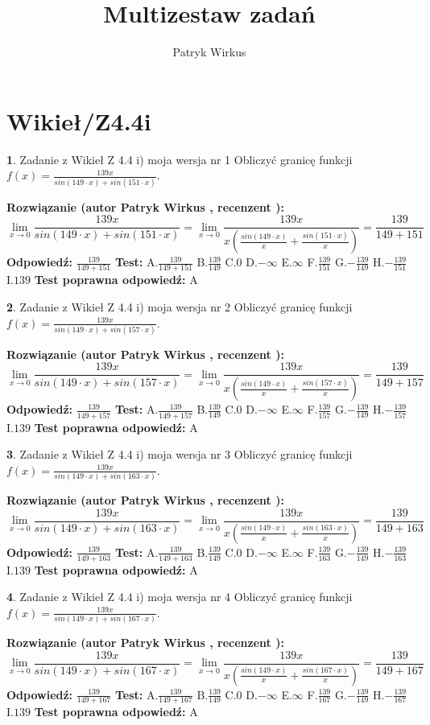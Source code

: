 \documentclass[12pt, a4paper]{article}
\title{Multizestaw zadań}
\author{Patryk Wirkus}
\date{}
\theoremstyle{definition} %
\newtheorem{zad}{}
\newcommand{\kategoria}[1]{\section{#1}}
\newcommand{\zadStart}[1]{\begin{zad}#1\newline}
\newcommand{\zadStop}{\end{zad}}
\newcommand{\rozwStart}[2]{\noindent \textbf{Rozwiązanie (autor #1 , recenzent #2): }\newline}
\newcommand{\rozwStop}{\newline}
\newcommand{\odpStart}{\noindent \textbf{Odpowiedź:}\newline}
\newcommand{\odpStop}{\newline}
\newcommand{\testStart}{\noindent \textbf{Test:}\newline}
\newcommand{\testStop}{\newline}
\newcommand{\kluczStart}{\noindent \textbf{Test poprawna odpowiedź:}\newline}
\newcommand{\kluczStop}{\newline}
\begin{document}
\maketitle

\kategoria{Wikieł/Z4.4i}


\zadStart{Zadanie z Wikieł Z 4.4 i) moja wersja nr 1}
Obliczyć granicę funkcji $f(x)=\frac{139x}{sin(149\cdot x) +sin(151\cdot x)}$.
\zadStop
\rozwStart{Patryk Wirkus}{}
$$\lim\limits_{x\to 0}\frac{139x}{sin(149\cdot x) +sin(151\cdot x)}=\lim\limits_{x\to 0}\frac{139x}{x(\frac{sin(149\cdot x)}{x}+\frac{sin(151\cdot x)}{x})}=\frac{139}{149+151}$$
\rozwStop
\odpStart
$\frac{139}{149+151}$
\odpStop
\testStart
A.$\frac{139}{149+151}$
B.$\frac{139}{149}$
C.$0$
D.$-\infty$
E.$\infty$
F.$\frac{139}{151}$
G.$-\frac{139}{149}$
H.$-\frac{139}{151}$
I.$139$
\testStop
\kluczStart
A
\kluczStop



\zadStart{Zadanie z Wikieł Z 4.4 i) moja wersja nr 2}
Obliczyć granicę funkcji $f(x)=\frac{139x}{sin(149\cdot x) +sin(157\cdot x)}$.
\zadStop
\rozwStart{Patryk Wirkus}{}
$$\lim\limits_{x\to 0}\frac{139x}{sin(149\cdot x) +sin(157\cdot x)}=\lim\limits_{x\to 0}\frac{139x}{x(\frac{sin(149\cdot x)}{x}+\frac{sin(157\cdot x)}{x})}=\frac{139}{149+157}$$
\rozwStop
\odpStart
$\frac{139}{149+157}$
\odpStop
\testStart
A.$\frac{139}{149+157}$
B.$\frac{139}{149}$
C.$0$
D.$-\infty$
E.$\infty$
F.$\frac{139}{157}$
G.$-\frac{139}{149}$
H.$-\frac{139}{157}$
I.$139$
\testStop
\kluczStart
A
\kluczStop



\zadStart{Zadanie z Wikieł Z 4.4 i) moja wersja nr 3}
Obliczyć granicę funkcji $f(x)=\frac{139x}{sin(149\cdot x) +sin(163\cdot x)}$.
\zadStop
\rozwStart{Patryk Wirkus}{}
$$\lim\limits_{x\to 0}\frac{139x}{sin(149\cdot x) +sin(163\cdot x)}=\lim\limits_{x\to 0}\frac{139x}{x(\frac{sin(149\cdot x)}{x}+\frac{sin(163\cdot x)}{x})}=\frac{139}{149+163}$$
\rozwStop
\odpStart
$\frac{139}{149+163}$
\odpStop
\testStart
A.$\frac{139}{149+163}$
B.$\frac{139}{149}$
C.$0$
D.$-\infty$
E.$\infty$
F.$\frac{139}{163}$
G.$-\frac{139}{149}$
H.$-\frac{139}{163}$
I.$139$
\testStop
\kluczStart
A
\kluczStop



\zadStart{Zadanie z Wikieł Z 4.4 i) moja wersja nr 4}
Obliczyć granicę funkcji $f(x)=\frac{139x}{sin(149\cdot x) +sin(167\cdot x)}$.
\zadStop
\rozwStart{Patryk Wirkus}{}
$$\lim\limits_{x\to 0}\frac{139x}{sin(149\cdot x) +sin(167\cdot x)}=\lim\limits_{x\to 0}\frac{139x}{x(\frac{sin(149\cdot x)}{x}+\frac{sin(167\cdot x)}{x})}=\frac{139}{149+167}$$
\rozwStop
\odpStart
$\frac{139}{149+167}$
\odpStop
\testStart
A.$\frac{139}{149+167}$
B.$\frac{139}{149}$
C.$0$
D.$-\infty$
E.$\infty$
F.$\frac{139}{167}$
G.$-\frac{139}{149}$
H.$-\frac{139}{167}$
I.$139$
\testStop
\kluczStart
A
\kluczStop
\end{document}
